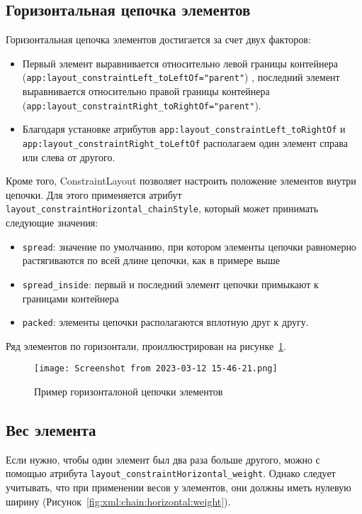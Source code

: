 \subsection{Горизонтальная цепочка элементов}
Горизонтальная цепочка элементов достигается за счет двух факторов:
\begin{itemize}
	\item Первый элемент выравнивается относительно левой границы
		контейнера (\texttt{app:layout\_constraintLeft\_toLeftOf="parent"})
		, последний
		элемент выравнивается относительно правой границы контейнера
		(\texttt{app:layout\_constraintRight\_toRightOf="parent"}).
	\item Благодаря установке атрибутов
		\texttt{app:layout\_constraintLeft\_toRightOf} и
		\texttt{app:layout\_constraintRight\_toLeftOf}
		располагаем один элемент справа или слева от другого.
\end{itemize}

Кроме того, ConstraintLayout позволяет настроить положение элементов
внутри цепочки. Для этого применяется атрибут
\texttt{layout\_constraintHorizontal\_chainStyle},
который может принимать следующие значения:
\label{tag:chain:style}
\begin{itemize}
	\item \texttt{spread}: значение по умолчанию, при котором элементы цепочки
		равномерно растягиваются по всей длине цепочки, как в примере выше
	\item \texttt{spread\_inside}: первый и последний элемент цепочки
		примыкают к границами контейнера
	\item \texttt{packed}: элементы цепочки располагаются вплотную
		друг к другу.
\end{itemize}

Ряд элементов по горизонтали, проиллюстрирован на
рисунке~\ref{fig:xml:chain:horizontal}.

\begin{figure}[h!tp]
	\centering
	\texttt{[image: Screenshot from 2023-03-12 15-46-21.png]}
	\caption{Пример горизонталоной цепочки элементов}
	\label{fig:xml:chain:horizontal}
\end{figure}

\subsection{Вес элемента}
Если нужно, чтобы один элемент был два раза больше другого, можно с
помощью атрибута \texttt{layout\_constraintHorizontal\_weight}. Однако следует
учитывать, что при применении весов у элементов, они должны иметь
нулевую ширину (Рисунок~\ref{fig:xml:chain:horizontal:weight}).

